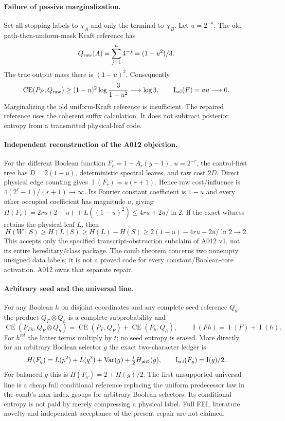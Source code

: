 \documentclass{article}
\newcommand{\CE}{\operatorname{CE}}
\newcommand{\I}{\operatorname{I}}
\begin{document}
\paragraph{Failure of passive marginalization.}
Set all stopping labels to $\chi_A$ and only the terminal to $\chi_B$.
Let $u=2^{-a}$. The old path-then-uniform-mask Kraft reference has
\[
 Q_{\rm raw}(A)=\sum_{j=1}^a4^{-j}=(1-u^2)/3.
\]
The true output mass there is $(1-u)^2$. Consequently
\[
 \CE(P_F,Q_{\rm raw})\ge(1-u)^2\log\frac3{1-u^2}\longrightarrow\log3,
 \qquad \I_{\rm sel}(F)=au\longrightarrow0.
\]
Marginalizing the old uniform-Kraft reference is insufficient. The repaired
reference uses the coherent suffix calculation. It does not subtract
posterior entropy from a transmitted physical-leaf code.

\paragraph{Independent reconstruction of the A012 objection.}
For the different Boolean function $F_r=1+A_r(y-1)$, $u=2^{-r}$,
the control-first tree has $D=2(1-u)$, deterministic spectral leaves,
and raw cost $2D$. Direct physical edge counting gives
$\I(F_r)=u(r+1)$. Hence raw cost/influence is
$4(2^r-1)/(r+1)\to\infty$. Its Fourier constant coefficient is $1-u$
and every other occupied coefficient has magnitude $u$, giving
$H(F_r)=2ru(2-u)+L((1-u)^2)\le4ru+2u/\ln2$.
If the exact witness retains the physical leaf $L$, then
\[
 H(W\mid S)\ge H(L\mid S)\ge H(L)-H(S)
 \ge2(1-u)-4ru-2u/\ln2\longrightarrow2.
\]
This accepts only the specified transcript-obstruction subclaim of
A012 v1, not its entire hereditary/class package. The comb theorem
concerns two nonempty unsigned data labels; it is not a proved code
for every constant/Boolean-core activation. A012 owns that separate repair.

\paragraph{Arbitrary seed and the universal line.}
For any Boolean $h$ on disjoint coordinates and any complete seed reference
$Q_h$, the product $Q_F\otimes Q_h$ is a complete subprobability and
\[
 \CE(P_{Fh},Q_F\otimes Q_h)=\CE(P_F,Q_F)+\CE(P_h,Q_h),\qquad
 \I(Fh)=\I(F)+\I(h).
\]
For $h^{\otimes t}$ the latter terms multiply by $t$; no seed entropy is
erased. More directly, for an arbitrary Boolean selector $g$ the exact
two-character ledger is
\[
 H(F_g)=L(p^2)+L(q^2)+\operatorname{Var}(g)+\tfrac12 H_{\ne\varnothing}(g),
 \qquad \I_{\rm sel}(F_g)=\I(g)/2.
\]
For balanced $g$ this is $H(F_g)=2+H(g)/2$. The first unsupported
universal line is a cheap full conditional reference replacing the uniform
predecessor law in the comb's max-index groups for arbitrary Boolean
selectors. Its conditional entropy is not paid by merely compressing a
physical label. Full FEI, literature novelty and independent acceptance
of the present repair are not claimed.
\end{document}
